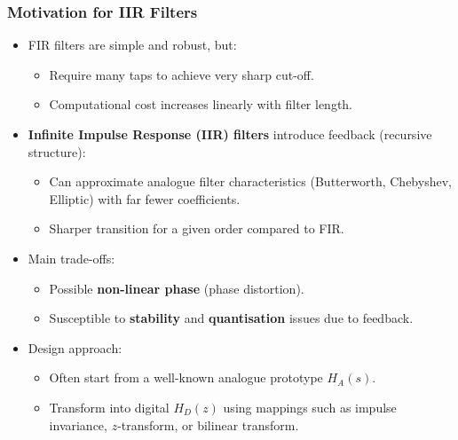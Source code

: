 \begin{frame}
	\frametitle{Motivation for IIR Filters}
	\small
	\begin{itemize}
		\item FIR filters are simple and robust, but:
		\begin{itemize}
			\item Require many taps to achieve very sharp cut-off.
			\item Computational cost increases linearly with filter length.
		\end{itemize}
		\item \textbf{Infinite Impulse Response (IIR) filters} introduce feedback (recursive structure):
		\begin{itemize}
			\item Can approximate analogue filter characteristics (Butterworth, Chebyshev, Elliptic) with far fewer coefficients.
			\item Sharper transition for a given order compared to FIR.
		\end{itemize}
		\item Main trade-offs:
		\begin{itemize}
			\item Possible \textbf{non-linear phase} (phase distortion).
			\item Susceptible to \textbf{stability} and \textbf{quantisation} issues due to feedback.
		\end{itemize}
		\item Design approach:
		\begin{itemize}
			\item Often start from a well-known analogue prototype $H_A(s)$.
			\item Transform into digital $H_D(z)$ using mappings such as impulse invariance, $z$-transform, or bilinear transform.
		\end{itemize}
	\end{itemize}
\end{frame}

